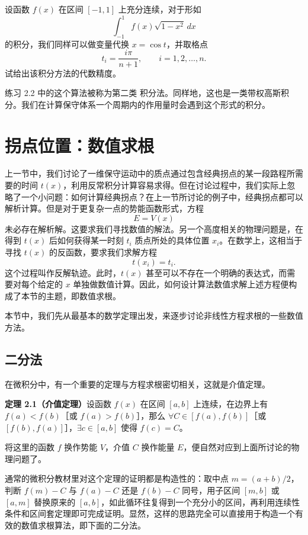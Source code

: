 \begin{exerciseBox}[练习 2.2]
设函数 $f(x)$ 在区间 $[-1,1]$ 上充分连续，对于形如
\[
\int_{-1}^{1}f(x)\sqrt{1-x^2}\,dx
\]
的积分，我们同样可以做变量代换 $x=\cos t$，并取格点
\[
t_i=\frac{i\pi}{n+1},\qquad i=1,2,\ldots,n.
\]
试给出该积分方法的代数精度。
\end{exerciseBox}

练习 2.2 中的这个算法被称为第二类 \ChebName{} 积分法。同样地，这也是一类带权高斯积分。我们在计算保守体系一个周期内的作用量时会遇到这个形式的积分。

\section{拐点位置：数值求根}

上一节中，我们讨论了一维保守运动中的质点通过包含经典拐点的某一段路程所需要的时间 $t(x)$，利用反常积分计算容易求得。但在讨论过程中，我们实际上忽略了一个小问题：如何计算经典拐点？在上一节所讨论的例子中，经典拐点都可以解析计算。但是对于更复杂一点的势能函数形式，方程
\[
E=V(x)
\]
未必存在解析解。这要求我们寻找数值的解法。另一个高度相关的物理问题是，在得到 $t(x)$ 后如何获得某一时刻 $t_i$ 质点所处的具体位置 $x_i$。在数学上，这相当于寻找 $t(x)$ 的反函数，要求我们求解方程
\[
t(x_i)=t_i.
\]
这个过程叫作反解轨迹。此时，$t(x)$ 甚至可以不存在一个明确的表达式，而需要对每个给定的 $x$ 单独做数值计算。因此，如何设计算法数值求解上述方程便构成了本节的主题，即数值求根。

本节中，我们先从最基本的数学定理出发，来逐步讨论非线性方程求根的一些数值方法。

\subsection{二分法}

在微积分中，有一个重要的定理与方程求根密切相关，这就是介值定理。

\textbf{定理 2.1（介值定理）}\quad 设函数 $f(x)$ 在区间 $[a,b]$ 上连续，在边界上有 $f(a)<f(b)$［或 $f(a)>f(b)$］，那么 $\forall C\in[f(a),f(b)]$［或 $[f(b),f(a)]$］，$\exists c\in[a,b]$ 使得 $f(c)=C$。

将这里的函数 $f$ 换作势能 $V$，介值 $C$ 换作能量 $E$，便自然对应到上面所讨论的物理问题了。

通常的微积分教材里对这个定理的证明都是构造性的：取中点 $m=(a+b)/2$，判断 $f(m)-C$ 与 $f(a)-C$ 还是 $f(b)-C$ 同号，用子区间 $[m,b]$ 或 $[a,m]$ 替换原来的 $[a,b]$，如此循环往复得到一个充分小的区间，再利用连续性条件和区间套定理即可完成证明。显然，这样的思路完全可以直接用于构造一个有效的数值求根算法，即下面的二分法。

